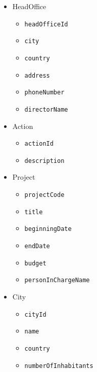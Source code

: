 \documentclass{assignment}
\begin{document}
\noindent
\begin{minipage}[t]{0.49\textwidth}
    \begin{itemize}[noitemsep]
        \item HeadOffice
            \begin{itemize}[noitemsep]
                \item \texttt{headOfficeId}
                \item \texttt{city}
                \item \texttt{country}
                \item \texttt{address}
                \item \texttt{phoneNumber}
                \item \texttt{directorName}
            \end{itemize}
        \item Action
            \begin{itemize}[noitemsep]
                \item \texttt{actionId}
                \item \texttt{description}
            \end{itemize}
    \end{itemize}
\end{minipage}
\hfill
\begin{minipage}[t]{0.49\textwidth}
    \begin{itemize}[noitemsep]
        \item Project
            \begin{itemize}[noitemsep]
                \item \texttt{projectCode}
                \item \texttt{title}
                \item \texttt{beginningDate}
                \item \texttt{endDate}
                \item \texttt{budget}
                \item \texttt{personInChargeName}
            \end{itemize}
        \item City
            \begin{itemize}[noitemsep]
                \item \texttt{cityId}
                \item \texttt{name}
                \item \texttt{country}
                \item \texttt{numberOfInhabitants}
            \end{itemize}
    \end{itemize}
\end{minipage}
\hfill
\end{document}
